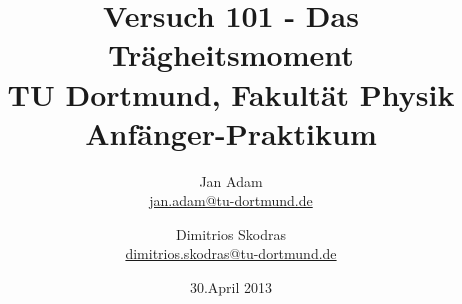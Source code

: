 



\title{Versuch 101 - Das Trägheitsmoment\\				%
\large TU Dortmund, Fakultät Physik\\ 
\normalsize Anfänger-Praktikum}

\author{Jan Adam\\			%
{\small \href{jan.adam@tu-dortmund.de}{jan.adam@tu-dortmund.de}}	%
\and						%
Dimitrios Skodras\\					%
{\small \href{dimitrios.skodras@tu-dortmund.de}{dimitrios.skodras@tu-dortmund.de}}		%
}
\date{30.April 2013}				%





\maketitle					%
\thispagestyle{empty} 				%



\tableofcontents


\newpage					%


